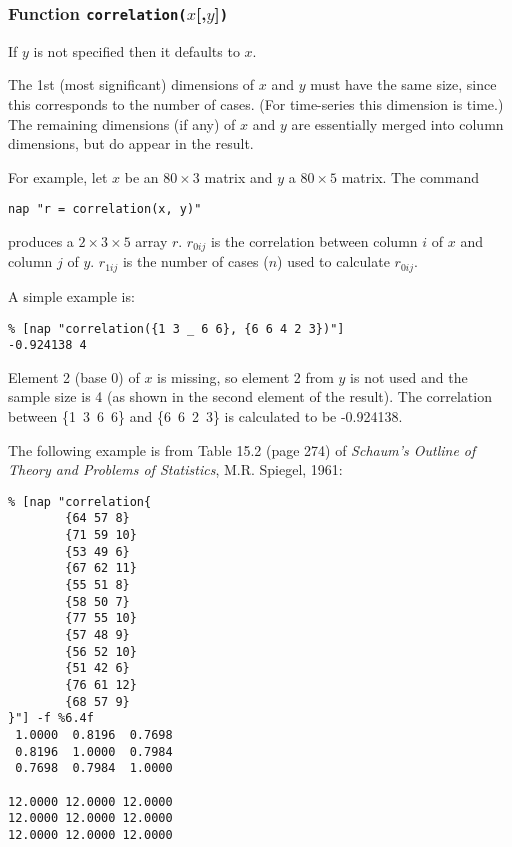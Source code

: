 \subsubsection{Function \texttt{correlation(}$x$[,$y$]\texttt{)}}
    \label{function-function-correlation}

  \par If 
  $y$ is not specified then it defaults to 
  $x$.
  \par The 1st (most significant) dimensions of 
  $x$ and 
  $y$ must have the same size, since this corresponds to the
  number of cases. (For time-series this dimension is time.) The
  remaining dimensions (if any) of 
  $x$ and 
  $y$ are essentially merged into column dimensions, but do
  appear in the result.
  \par For example, let 
  $x$ be an $80\times 3$ matrix and 
  $y$ a $80\times 5$ matrix. The command
  \begin{verbatim}
nap "r = correlation(x, y)"
\end{verbatim}

produces a $2\times 3\times 5$ array 
  $r$. 
  $r_{0ij}$
  is the correlation between column 
  $i$ of 
  $x$ and column 
  $j$ of 
  $y$. 
  $r_{1ij}$
  is the number of cases ($n$) used to calculate 
  $r_{0ij}$.
  \par A simple example is:
  \begin{verbatim}
% [nap "correlation({1 3 _ 6 6}, {6 6 4 2 3})"]
-0.924138 4
\end{verbatim}

Element 2 (base 0) of 
  $x$ is missing, so element 2 from 
  $y$ is not used and the sample size is 4 (as shown in the
  second element of the result). The correlation between
  \{1\ 3\ 6\ 6\} and \{6\ 6\ 2\ 3\} is calculated
  to be -0.924138.
  \par The following example is from Table 15.2 (page 274) of 
  \emph{Schaum's Outline of Theory and Problems of
  Statistics}, M.R. Spiegel, 1961:
  \begin{verbatim}
% [nap "correlation{
        {64 57 8}
        {71 59 10}
        {53 49 6}
        {67 62 11}
        {55 51 8}
        {58 50 7}
        {77 55 10}
        {57 48 9}
        {56 52 10}
        {51 42 6}
        {76 61 12}
        {68 57 9}
}"] -f %6.4f
 1.0000  0.8196  0.7698
 0.8196  1.0000  0.7984
 0.7698  0.7984  1.0000

12.0000 12.0000 12.0000
12.0000 12.0000 12.0000
12.0000 12.0000 12.0000
\end{verbatim}

